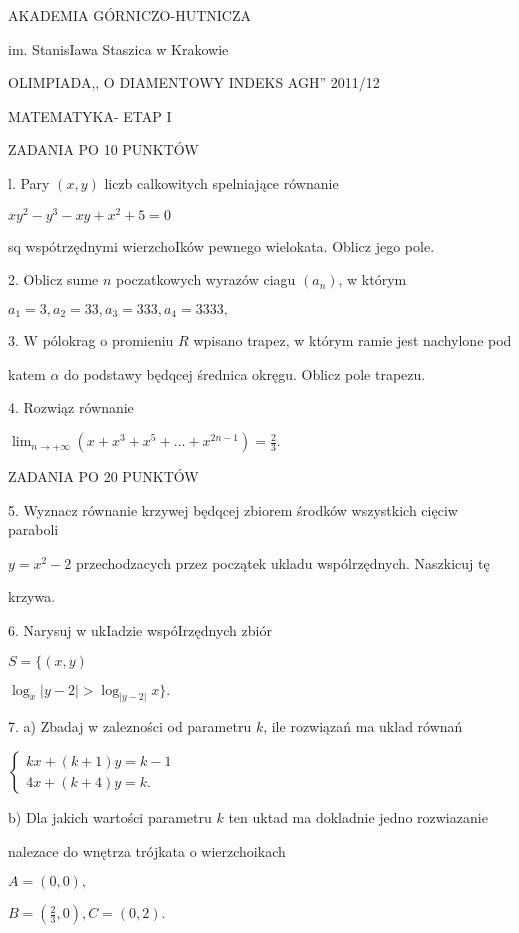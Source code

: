 \documentclass[a4paper,12pt]{article}
\begin{document}
AKADEMIA GÓRNICZO-HUTNICZA

im. StanisIawa Staszica w Krakowie

OLIMPIADA,, O DIAMENTOWY INDEKS AGH'' 2011/12

MATEMATYKA- ETAP I

ZADANIA PO 10 PUNKTÓW

l. Pary $(x,y)$ liczb calkowitych spelniające równanie

$xy^{2}-y^{3}-xy+x^{2}+5=0$

sq wspótrzędnymi wierzchoIków pewnego wielokata. Oblicz jego pole.

2. Oblicz sume $n$ poczatkowych wyrazów ciagu $(a_{n})$, w którym

$a_{1}=3, a_{2}=33, a_{3}=333, a_{4}=3333,$

3. $\mathrm{W}$ pólokrag o promieniu $R$ wpisano trapez, w którym ramie jest nachylone pod

katem $\alpha$ do podstawy będqcej średnica okręgu. Oblicz pole trapezu.

4. Rozwiąz równanie

$\displaystyle \lim_{n\rightarrow+\infty}(x+x^{3}+x^{5}+\ldots+x^{2n-1})=\frac{2}{3}.$

ZADANIA PO 20 PUNKTÓW

5. Wyznacz równanie krzywej będqcej zbiorem środków wszystkich cięciw paraboli

$y = x^{2}-2$ przechodzacych przez początek ukladu wspólrzędnych. Naszkicuj tę

krzywa.

6. Narysuj w ukIadzie wspóIrzędnych zbiór

$S=\{(x,y)$

$\log_{x}|y-2|>\log_{|y-2|}x\}.$

7. a) Zbadaj w zalezności od parametru $k$, ile rozwiązań ma uklad równań

$\left\{\begin{array}{l}
kx+(k+1)y=k-1\\
4x+(k+4)y=k.
\end{array}\right.$

b) Dla jakich wartości parametru $k$ ten uktad ma dokladnie jedno rozwiazanie

nalezace do wnętrza trójkata o wierzchoikach

$A=(0,0),$

$B=(\displaystyle \frac{2}{3},0), C=(0,2).$
\end{document}
